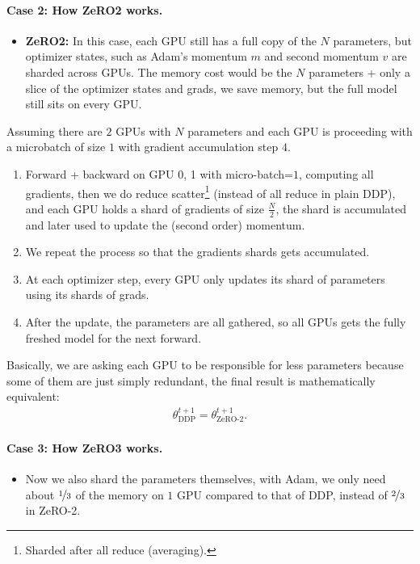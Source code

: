 \documentclass[11pt]{article}  %
\begin{document}
\paragraph{Case 2: How ZeRO2 works.}
\begin{itemize}
  \item \textbf{ZeRO2:} In this case, each GPU still has a full copy of the $N$ parameters, but optimizer states, such as Adam's momentum $m$ and second momentum $v$ are sharded across GPUs.
  The memory cost would be the $N$ parameters + only a slice of the optimizer states and grads, we save memory, but the full model still sits on every GPU.
\end{itemize}
Assuming there are $2$ GPUs with $N$ parameters and each GPU is proceeding with a microbatch of size $1$ with gradient accumulation step $4$.
\begin{enumerate}
  \item Forward + backward on GPU 0, 1 with micro-batch=$1$, computing all gradients, then we do reduce scatter\footnote{Sharded after all reduce (averaging).} (instead of all reduce in plain DDP), and each GPU holds a shard of gradients of size $\frac{N}{2}$, the shard is accumulated and later used to update the (second order) momentum.
  
  \item We repeat the process so that the gradients shards gets accumulated.
  
  \item At each optimizer step, every GPU only updates its shard of parameters using its shards of grads.
  
  \item After the update, the parameters are all gathered, so all GPUs gets the fully freshed model for the next forward.
\end{enumerate} 
Basically, we are asking each GPU to be responsible for less parameters because some of them are just simply redundant, the final result is mathematically equivalent:
\begin{align}
  \theta_{\text{DDP}}^{t+1} = \theta^{t+1}_{\text{ZeRO-}2}.
\end{align}


\paragraph{Case 3: How ZeRO3 works.}
\begin{itemize}
  \item Now we also shard the parameters themselves, with Adam, we only need about $\nicefrac{1}{3}$ of the memory on $1$ GPU compared to that of DDP, instead of $\nicefrac{2}{3}$ in ZeRO-2.
\end{itemize}
\end{document}
